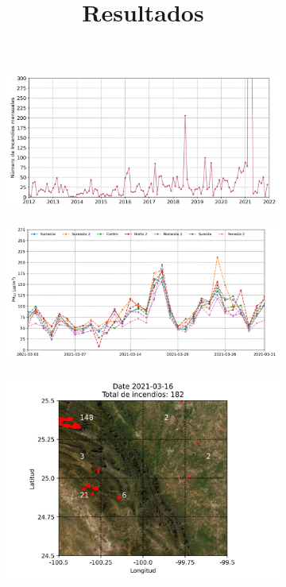 \title{Resultados}

\begin{figure}[H]
    \centering
    \changefontsizes{10pt}
    \begin{subfigure}{0.34\textwidth}
        \includegraphics[width=1\linewidth]{Graphics/Fire_Per_Month.png}
        \caption*{}
    \end{subfigure}
    \hspace*{0.2cm}
    \begin{subfigure}{0.34\textwidth}
        \includegraphics[width=1\linewidth]{Graphics/PM10.png}
        \caption*{}
    \end{subfigure}
    \hspace*{0.2cm}
    \begin{subfigure}{0.23\textwidth}
        \includegraphics[width=1\linewidth]{Graphics/2021-03-16.png}

\end{subfigure}
\end{figure}
